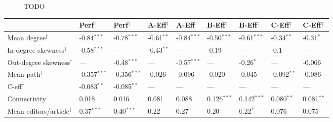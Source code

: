 \documentclass[10pt,twocolumn]{article}
\newcommand{\+}{\phantom{-}}
\begin{document}
\begin{figure}
\caption{
TODO
\label{fig:degree-mincut}
}
\end{figure}

\begin{table*}
\small
\begin{tabular}{lllllllll}
                               & Perf$^\dagger$ & Perf$^\dagger$ & A-Eff$^\dagger$ & A-Eff$^\dagger$ & B-Eff$^\dagger$ & B-Eff$^\dagger$ & C-Eff$^\dagger$ & C-Eff$^\dagger$ \\
\hline
Mean degree$^\dagger$          &  -0.84$^{***}$  &  -0.78$^{***}$
                               &  -0.61$^{**}$   &  -0.84$^{***}$
                               &  -0.50$^{***}$  &  -0.61$^{***}$
                               &  -0.34$^{**}$   &  -0.31$^{*}$ \\
In-degree skewness$^\dagger$   &  -0.58$^{***}$  & \+ ---      
                               &  -0.43$^{**}$   & \+ ---      
                               &  -0.19          & \+ ---      
                               &  -0.1           & \+ ---      \\
Out-degree skewness$^\dagger$  &  \+ ---         &  -0.48$^{***}$  
                               &  \+ ---         &  -0.57$^{***}$
                               &  \+ ---         &  -0.26$^{*}$
                               &  \+ ---         &  -0.066 \\
Mean path$^\dagger$            &  -0.357$^{***}$ &  -0.356$^{***}$ 
                               &  -0.026         &  -0.096
                               &  -0.020         &  -0.045
                               &  -0.092$^{**}$  &  -0.086 \\
C-eff$^\dagger$                &  -0.083$^{**}$  & -0.085$^{**}$  
                               &  \+ ---         & \+ ---      
                               &  \+ ---         & \+ ---      
                               &  \+ ---         & \+ --- \\
Connectivity                   & \+0.018         & \+0.016        
                               & \+0.081         & \+0.088
                               & \+0.126$^{***}$ & \+0.142$^{***}$
                               & \+0.080$^{**}$  & \+0.081$^{**}$ \\
Mean editors/article$^\dagger$ & \+0.37$^{***}$  & \+0.40$^{***}$ 
                               & \+0.22          & \+0.27
                               & \+0.20          & \+0.22$^{*}$
                               & \+0.076         & \+0.075 \\

\end{tabular}
\end{table*}
\end{document}
